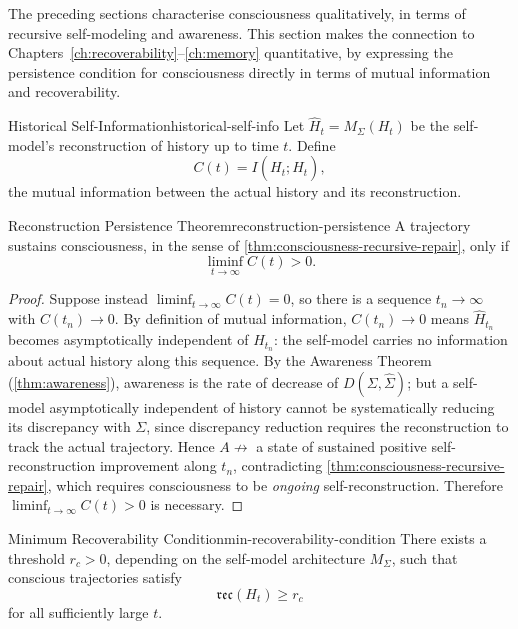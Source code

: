 \documentclass[12pt,twoside,openright]{book}
\begin{document}
The preceding sections characterise consciousness
qualitatively, in terms of recursive self-modeling and
awareness. This section makes the connection to
Chapters~\ref{ch:recoverability}--\ref{ch:memory}
quantitative, by expressing the persistence condition for
consciousness directly in terms of mutual information and
recoverability.

\begin{definition}{Historical Self-Information}{historical-self-info}
  Let $\hat{H}_t = M_\Sigma(H_t)$ be the self-model's
  reconstruction of history up to time $t$. Define
  \[
    C(t) = I(H_t; \hat{H}_t),
  \]
  the mutual information between the actual history and its
  reconstruction.
\end{definition}

\begin{theorem}{Reconstruction Persistence Theorem}{reconstruction-persistence}
  A trajectory sustains consciousness, in the sense of
  \cref{thm:consciousness-recursive-repair}, only if
  \[
    \liminf_{t\to\infty} C(t) > 0.
  \]
\end{theorem}

\begin{proof}
  Suppose instead $\liminf_{t\to\infty} C(t) = 0$, so there
  is a sequence $t_n\to\infty$ with $C(t_n)\to0$. By
  definition of mutual information, $C(t_n)\to0$ means
  $\hat{H}_{t_n}$ becomes asymptotically independent of
  $H_{t_n}$: the self-model carries no information about
  actual history along this sequence. By the Awareness
  Theorem (\cref{thm:awareness}), awareness is the rate of
  decrease of $D(\Sigma,\hat\Sigma)$; but a self-model
  asymptotically independent of history cannot be
  systematically reducing its discrepancy with $\Sigma$,
  since discrepancy reduction requires the reconstruction to
  track the actual trajectory. Hence
  $A \not\to$ a state of sustained positive
  self-reconstruction improvement along $t_n$, contradicting
  \cref{thm:consciousness-recursive-repair}, which requires
  consciousness to be \emph{ongoing} self-reconstruction.
  Therefore $\liminf_{t\to\infty} C(t) > 0$ is necessary.
\end{proof}

\begin{theorem}{Minimum Recoverability Condition}{min-recoverability-condition}
  There exists a threshold $r_c > 0$, depending on the
  self-model architecture $M_\Sigma$, such that conscious
  trajectories satisfy
  \[
    \mathfrak{rec}(H_t) \ge r_c
  \]
  for all sufficiently large $t$.
\end{theorem}
\end{document}

